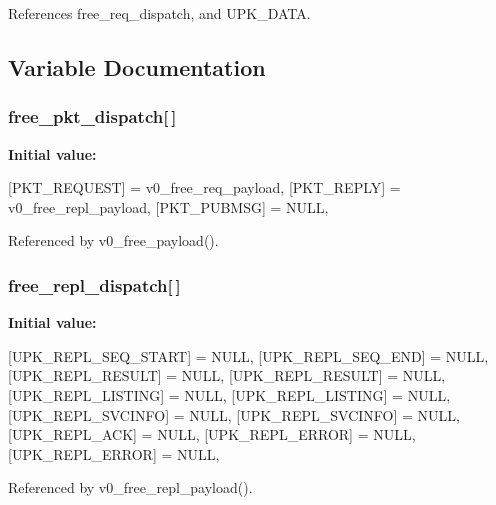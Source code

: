 References free\_\-req\_\-dispatch, and UPK\_\-DATA.



\subsection{Variable Documentation}
\subsubsection[{free\_\-pkt\_\-dispatch}]{ {\bf free\_\-pkt\_\-dispatch}[$\,$]\hspace{0.3cm}{\ttfamily  [static]}}\label{upk__v0__protocol_8c_a089e008a6188d8b5335062e1bb7e3bfc}
{\bfseries Initial value:}
\begin{DoxyCode}
 {
    [PKT_REQUEST] = v0_free_req_payload,
    [PKT_REPLY] = v0_free_repl_payload,
    [PKT_PUBMSG] = NULL,
}
\end{DoxyCode}


Referenced by v0\_\-free\_\-payload().

\subsubsection[{free\_\-repl\_\-dispatch}]{ {\bf free\_\-repl\_\-dispatch}[$\,$]\hspace{0.3cm}{\ttfamily  [static]}}\label{upk__v0__protocol_8c_a1abf93e0a342eb204459fbad7ba034f0}
{\bfseries Initial value:}
\begin{DoxyCode}
 {
    [UPK_REPL_SEQ_START] = NULL,
    [UPK_REPL_SEQ_END] = NULL,
    [UPK_REPL_RESULT] = NULL,
    [UPK_REPL_RESULT] = NULL,
    [UPK_REPL_LISTING] = NULL,
    [UPK_REPL_LISTING] = NULL,
    [UPK_REPL_SVCINFO] = NULL,
    [UPK_REPL_SVCINFO] = NULL,
    [UPK_REPL_ACK] = NULL,
    [UPK_REPL_ERROR] = NULL,
    [UPK_REPL_ERROR] = NULL,
}
\end{DoxyCode}


Referenced by v0\_\-free\_\-repl\_\-payload().

